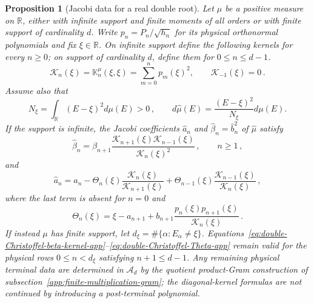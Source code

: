 \documentclass[a4paper,11pt]{article}
\def\dd{d}%
\newtheorem{proposition}{Proposition}[section]
\theoremstyle{definition}
\theoremstyle{remark}
\newcommand{\dd}{\mathrm d}
\newcommand{\RR}{\mathbb R}
\newcommand{\cA}{\mathcal A}
\begin{document}
\begin{proposition}[Jacobi data for a real double root]
\label{prop:double-Christoffel-kernel-Jacobi-app}
Let $\mu$ be a positive measure on $\RR$, either with infinite support
and finite moments of all orders or with finite support of cardinality
$d$.  Write $p_n=P_n/\sqrt{h_n}$ for its physical orthonormal
polynomials and fix $\xi\in\RR$.  %
On infinite support define the following kernels for every $n\ge0$; on support of cardinality
$d$, define them for $0\le n\le d-1$.
\begin{equation}
   \mathcal K_n(\xi)=\mathbb K_n^\mu(\xi,\xi)
   =\sum_{m=0}^{n}p_m(\xi)^2,
   \qquad \mathcal K_{-1}(\xi)=0\,.
   \label{eq:one-root-kernel-sequence-app}
\end{equation}
Assume also that
\begin{equation}
   N_\xi=\int_{\RR}(E-\xi)^2\dd\mu(E)>0\,,
   \qquad
   \dd\widehat\mu(E)=\frac{(E-\xi)^2}{N_\xi}\dd\mu(E).
\end{equation}
If the support is infinite, the Jacobi coefficients
$\widehat a_n$ and $\widehat\beta_n=\widehat b_n^2$ of
$\widehat\mu$ satisfy
\begin{equation}
   \widehat\beta_n
   =\beta_{n+1}
      \frac{\mathcal K_{n+1}(\xi)\mathcal K_{n-1}(\xi)}
           {\mathcal K_n(\xi)^2}\,,
   \qquad n\ge1\,,
   \label{eq:double-Christoffel-beta-kernel-app}
\end{equation}
and
\begin{equation}
   \widehat a_n
   =a_n-\Theta_n(\xi)
       \frac{\mathcal K_n(\xi)}{\mathcal K_{n+1}(\xi)}
      +\Theta_{n-1}(\xi)
       \frac{\mathcal K_{n-1}(\xi)}{\mathcal K_n(\xi)}\,,
   \label{eq:double-Christoffel-a-kernel-app}
\end{equation}
where the last term is absent for $n=0$ and
\begin{equation}
   \Theta_n(\xi)
   =\xi-a_{n+1}
      +b_{n+1}\frac{p_n(\xi)p_{n+1}(\xi)}{\mathcal K_n(\xi)}\,.
   \label{eq:double-Christoffel-Theta-app}
\end{equation}
If instead $\mu$ has finite support, let
$d_\xi=\#\{\alpha:E_\alpha\ne\xi\}$.
Equations~\eqref{eq:double-Christoffel-beta-kernel-app}--\eqref{eq:double-Christoffel-Theta-app}
remain valid for the physical rows $0\le n<d_\xi$ satisfying
$n+1\le d-1$.  Any remaining physical terminal data are determined in
$\cA_d$ by the quotient product-Gram construction of
subsection~\ref{app:finite-multiplication-gram}; the diagonal-kernel
formulas are not continued by introducing a post-terminal polynomial.
\end{proposition}
\end{document}
